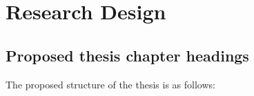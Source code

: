 \documentclass[a4paper,11pt]{article}
\begin{document}



\newpage


\section{Research Design} %
\label{sec:research_design}

\subsection{Proposed thesis chapter headings} %
\label{sub:proposed_thesis_chapter_headings}

The proposed structure of the thesis is as follows:
\end{document}
